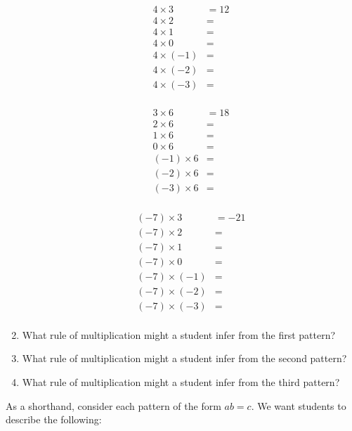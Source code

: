 \documentclass[nooutcomes]{ximera}
\begin{document}
\begin{problem}
\begin{enumerate}
\begin{center}
\begin{minipage}{0.3\textwidth}
\begin{align*}
4\times 3 &= 12 \\
4\times 2 &= \\
4\times 1 &= \\
4\times 0 &= \\
4\times (-1) &= \\
4\times (-2) &= \\
4\times (-3) &= \\
\end{align*}
\end{minipage}
\begin{minipage}{0.3\textwidth}
\begin{align*}
3\times 6 &= 18 \\
2\times 6 &= \\
1\times 6 &= \\
0\times 6 &= \\
(-1)\times 6 &= \\
(-2)\times 6 &= \\
(-3)\times 6 &= \\
\end{align*}
\end{minipage}
\begin{minipage}{0.3\textwidth}
\begin{align*}
(-7)\times 3 &= -21 \\
(-7)\times 2 &= \\
(-7)\times 1 &= \\
(-7)\times 0 &= \\
(-7)\times (-1) &= \\
(-7)\times (-2) &= \\
(-7)\times (-3) &= \\
\end{align*}
\end{minipage}
\end{center}
\item What rule of multiplication might a student infer from the first pattern? 
\item What rule of multiplication might a student infer from the second pattern?
\item What rule of multiplication might a student infer from the third pattern?
\end{enumerate}
\begin{teachingnote}
As a shorthand, consider each pattern of the form $ab = c$.  We want students to describe the following:  

\end{teachingnote}
\end{problem}
\end{document}
